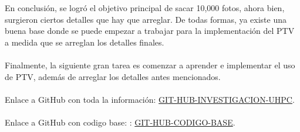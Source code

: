 \documentclass{article}
\begin{document}
\noindent En conclusión, se logró el objetivo principal de sacar 10,000 fotos, ahora bien, surgieron ciertos detalles que hay que arreglar. De todas formas, ya existe una buena
base donde se puede empezar a trabajar para la implementación del PTV a medida que se arreglan los detalles finales.
\\ \\
Finalmente, la siguiente gran tarea es comenzar a aprender e implementar el uso de PTV, además de arreglar los detalles antes mencionados.
\\ \\
\noindent Enlace a GitHub con toda la información: \href{https://github.com/LukasWolff2002/SINCRONIZACION_CAMARAS_BASLER}{GIT-HUB-INVESTIGACION-UHPC}.
\\ \\
\noindent Enlace a GitHub con codigo base: : \href{https://github.com/basler/pypylon/blob/master/samples/grabmultiplecameras.py}{GIT-HUB-CODIGO-BASE}.
\end{document}
